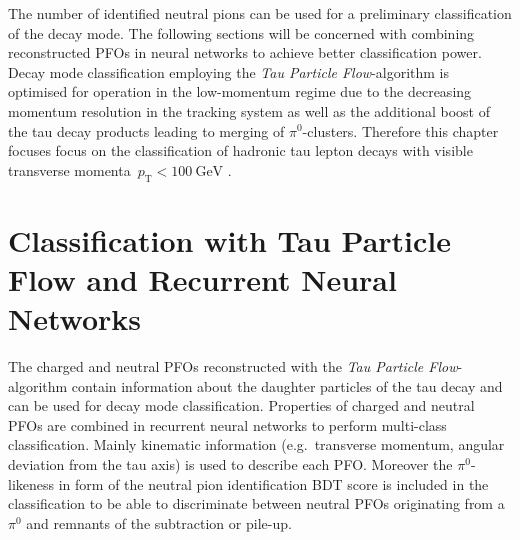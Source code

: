 The number of identified neutral pions can be used for a preliminary
classification of the decay mode. The following sections will be concerned with
combining reconstructed PFOs in neural networks to achieve better classification
power. Decay mode classification employing the \emph{Tau Particle
  Flow}-algorithm is optimised for operation in the low-momentum regime due to
the decreasing momentum resolution in the tracking system as well as the
additional boost of the tau decay products leading to merging of
$\pi^0$-clusters. Therefore this chapter focuses focus on the classification of
hadronic tau lepton decays with visible transverse
momenta~$p_\text{T} < \SI{100}{\giga\electronvolt}$ .

\section{Classification with Tau Particle Flow and Recurrent Neural Networks}
\label{sec:pfo_general}

The charged and neutral PFOs reconstructed with the \emph{Tau Particle
  Flow}-algorithm contain information about the daughter particles of the tau
decay and can be used for decay mode classification. Properties of charged and
neutral PFOs are combined in recurrent neural networks to perform multi-class
classification. Mainly kinematic information (e.g.\ transverse momentum, angular
deviation from the tau axis) is used to describe each PFO. Moreover the
$\pi^0$-likeness in form of the neutral pion identification BDT score is
included in the classification to be able to discriminate between neutral PFOs
originating from a $\pi^0$ and remnants of the subtraction or pile-up.


